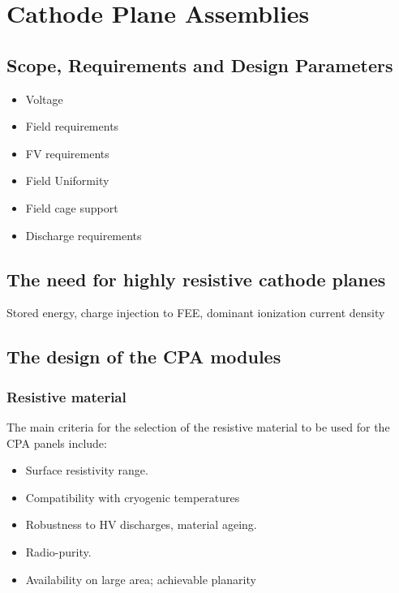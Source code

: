 


\section{Cathode Plane Assemblies}


\subsection{Scope, Requirements and Design Parameters}
\begin{itemize}
\item Voltage
\item Field requirements
\item FV requirements
\item Field Uniformity
\item Field cage support
\item Discharge requirements

\end{itemize}

\subsection{The need for highly resistive cathode planes}
Stored energy, charge injection to FEE, dominant ionization current density


\subsection{The design of the CPA modules}

\subsubsection{Resistive material}

The main criteria for the selection of the resistive material to be used for the CPA panels include: 
\begin{itemize}	
\item Surface resistivity range.
\item Compatibility with cryogenic temperatures
\item Robustness to HV discharges, material ageing.
\item Radio-purity.
\item Availability on large area; achievable planarity 
\end{itemize}

